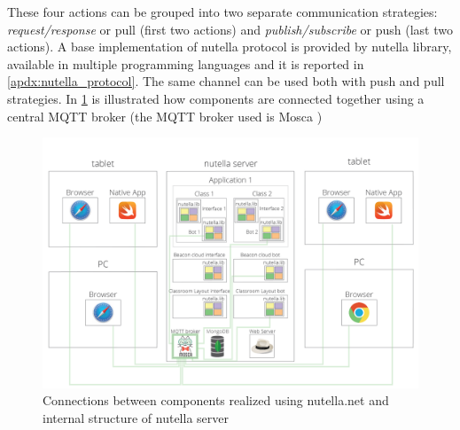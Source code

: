 These four actions can be grouped into two separate communication strategies: \textit{request/response} or pull (first two actions) and \textit{publish/subscribe} or push (last two actions). A base implementation of nutella protocol is provided by nutella library, available in multiple programming languages \cite{nutella_framework} and it is reported in \autoref{apdx:nutella_protocol}. The same channel can be used both with push and pull strategies. In \ref{fig:nutella_overview} is illustrated how components are connected together using a central MQTT broker (the MQTT broker used is Mosca \cite{Mosca})

\begin{figure}
\centering
\includegraphics[width=6in]{images/nutella-client-server-broker.png}
\caption{Connections between components realized using nutella.net and internal structure of nutella server}
\label{fig:nutella_overview}
\end{figure}

